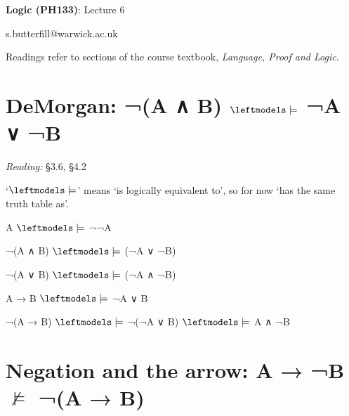 \documentclass[12pt]{extarticle}
\date{}
\makeatletter
\def \ititle {Origins of Mind}
\def \isubtitle {Lecture 08}
\def \iemail{s.butterfill@warwick.ac.uk}
\makeatother
\begin{document}

\begin{multicols*}{3}

\setlength\footnotesep{1em}








\def \ititle {Logic (PH133)}
 
\def \isubtitle {Lecture 6}
 
\begin{center}
 
{\Large
 
\textbf{\ititle}: \isubtitle
 
}
 
 
 
\iemail %
 
\end{center}
 
Readings refer to sections of the course textbook, \emph{Language, Proof and Logic}.
 
 
 
\section{DeMorgan: ¬(A ∧ B) $\leftmodels\models$ ¬A ∨ ¬B}
 
\emph{Reading:} §3.6, §4.2
 
`$\leftmodels\models$' means `is logically equivalent to', so for now `has the same truth table as'.
 
A $\leftmodels\models$ ¬¬A
 
¬(A ∧ B) $\leftmodels\models$ (¬A ∨ ¬B)
 
¬(A ∨ B) $\leftmodels\models$ (¬A ∧ ¬B)
 
A → B $\leftmodels\models$ ¬A ∨ B
 
¬(A → B) $\leftmodels\models$ ¬(¬A ∨ B) $\leftmodels\models$ A ∧ ¬B
 
 
 
\section{Negation and the arrow: A → ¬B $\nvDash$ ¬(A → B)}
 

\end{multicols*}
\end{document}
